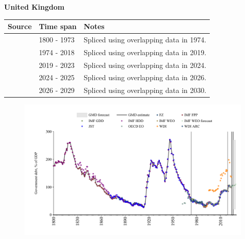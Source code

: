 \documentclass[12pt,a4paper,landscape]{article}
\begin{document}
\begin{adjustbox}{max totalsize={\paperwidth}{\paperheight},center}
\begin{minipage}[t][\textheight][t]{\textwidth}
\vspace*{0.5cm}
{}
\begin{center}
{\Large\bfseries United Kingdom}
\end{center}
\vspace{0.5cm}
\begin{table}[H]
\centering
\small
\begin{tabular}{|l|l|l|}
\hline
\textbf{Source} & \textbf{Time span} & \textbf{Notes} \\
\hline
\rowcolor{white}\cite{IMF_FPP}& 1800 - 1973 &Spliced using overlapping data in 1974.\\
\rowcolor{lightgray}\cite{IMF_GDD}& 1974 - 2018 &Spliced using overlapping data in 2019.\\
\rowcolor{white}\cite{IMF_FPP}& 2019 - 2023 &Spliced using overlapping data in 2024.\\
\rowcolor{lightgray}\cite{OECD_EO}& 2024 - 2025 &Spliced using overlapping data in 2026.\\
\rowcolor{white}\cite{IMF_WEO_forecast}& 2026 - 2029 &Spliced using overlapping data in 2030.\\
\hline
\end{tabular}
\end{table}
\begin{figure}[H]
\centering
\includegraphics[width=\textwidth,height=0.6\textheight,keepaspectratio]{graphs/GBR_govdebt_GDP.pdf}
\end{figure}
\end{minipage}
\end{adjustbox}
\end{document}
